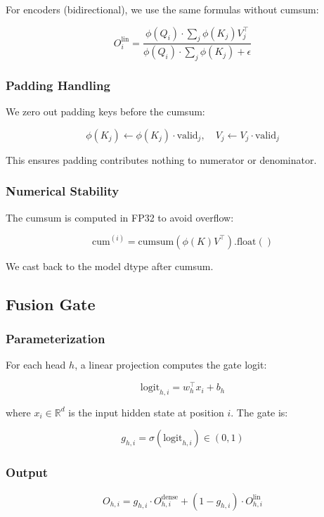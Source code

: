 For encoders (bidirectional), we use the same formulas without cumsum:

\[
O^\text{lin}_i = \frac{\phi(Q_i) \cdot \sum_j \phi(K_j) V_j^\top}{\phi(Q_i) \cdot \sum_j \phi(K_j) + \epsilon}
\]

\subsubsection{Padding Handling}

We zero out padding keys before the cumsum:

\[
\phi(K_j) \leftarrow \phi(K_j) \cdot \text{valid}_j, \quad
V_j \leftarrow V_j \cdot \text{valid}_j
\]

This ensures padding contributes nothing to numerator or denominator.

\subsubsection{Numerical Stability}

The cumsum is computed in FP32 to avoid overflow:

\[
\text{cum}^{(i)} = \text{cumsum}(\phi(K) V^\top).\text{float}()
\]

We cast back to the model dtype after cumsum.

\subsection{Fusion Gate}

\subsubsection{Parameterization}

For each head $h$, a linear projection computes the gate logit:

\[
\text{logit}_{h,i} = w_h^\top x_i + b_h
\]

where $x_i \in \mathbb{R}^d$ is the input hidden state at position $i$. The 
gate is:

\[
g_{h,i} = \sigma(\text{logit}_{h,i}) \in (0, 1)
\]

\subsubsection{Output}

\[
O_{h,i} = g_{h,i} \cdot O^\text{dense}_{h,i} + (1 - g_{h,i}) \cdot O^\text{lin}_{h,i}
\]

